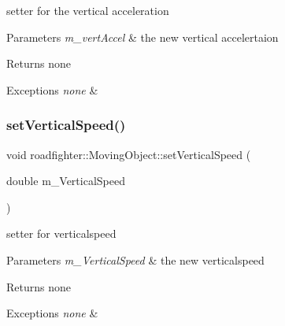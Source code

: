 setter for the vertical acceleration 
\begin{DoxyParams}{Parameters}
{\em m\+\_\+vert\+Accel} & the new vertical accelertaion \\
\hline
\end{DoxyParams}
\begin{DoxyReturn}{Returns}
none 
\end{DoxyReturn}

\begin{DoxyExceptions}{Exceptions}
{\em none} & \\
\hline
\end{DoxyExceptions}
\mbox{\label{classroadfighter_1_1MovingObject_a7382aeb5c2e7254dde2cc571c85a8fbb}} 
\subsubsection{\texorpdfstring{set\+Vertical\+Speed()}{setVerticalSpeed()}}
{\footnotesize\ttfamily void roadfighter\+::\+Moving\+Object\+::set\+Vertical\+Speed (\begin{DoxyParamCaption}\item[{double}]{m\+\_\+\+Vertical\+Speed }\end{DoxyParamCaption})}

setter for verticalspeed 
\begin{DoxyParams}{Parameters}
{\em m\+\_\+\+Vertical\+Speed} & the new verticalspeed \\
\hline
\end{DoxyParams}
\begin{DoxyReturn}{Returns}
none 
\end{DoxyReturn}

\begin{DoxyExceptions}{Exceptions}
{\em none} & \\
\hline
\end{DoxyExceptions}
\mbox{\label{classroadfighter_1_1MovingObject_a9aa56ab17060aabcae8604633993323f}} 

